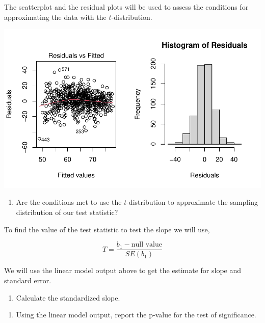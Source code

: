 \documentclass[
]{report}
\providecommand{\tightlist}{%
  \setlength{\itemsep}{0pt}\setlength{\parskip}{0pt}}
\begin{document}
The scatterplot and the residual plots will be used to assess the conditions for approximating the data with the \(t\)-distribution.

\begin{center}\includegraphics[width=0.7\linewidth]{14-UR-module13_review_files/figure-latex/unnamed-chunk-7-1} \end{center}

\begin{enumerate}
\def\labelenumi{\arabic{enumi}.}
\setcounter{enumi}{11}
\tightlist
\item
  Are the conditions met to use the \(t\)-distribution to approximate the sampling distribution of our test statistic?
\end{enumerate}

\newpage

To find the value of the test statistic to test the slope we will use,

\[
T = \frac{b_1- \text{null value}}{SE(b_1)}
\]

We will use the linear model output above to get the estimate for slope and standard error.

\begin{enumerate}
\def\labelenumi{\arabic{enumi}.}
\setcounter{enumi}{12}
\tightlist
\item
  Calculate the standardized slope.
\end{enumerate}

\vspace{1in}

\begin{enumerate}
\def\labelenumi{\arabic{enumi}.}
\setcounter{enumi}{13}
\tightlist
\item
  Using the linear model output, report the p-value for the test of significance.
\end{enumerate}

\vspace{0.5in}
\end{document}
